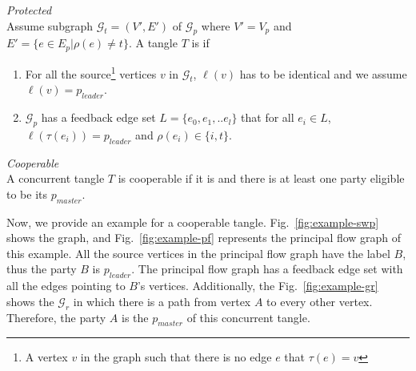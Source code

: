 \begin{definition}{\it Protected}\\
\label{def:pfok}
Assume subgraph $\mathcal{G}_{t}=(V', E')$ of $\mathcal{G}_{p}$ where $V'=V_p$ and $E'=\{e \in E_p | \rho(e) \neq t\}$.
A tangle $T$ is \keyoneOk if
\begin{enumerate}
    \item For all the source\footnote{A vertex $v$ in the graph such that there is no edge $e$ that $\tau(e) = v$} vertices $v$ in $\mathcal{G}_{t}$, $\ell(v)$ has to be identical and we assume $\ell(v)=p_{leader}$.
    \item $\mathcal{G}_{p}$ has a feedback edge set $L=\{e_0, e_1, ..e_l\}$ that for all $e_i \in L$, $\ell(\tau(e_i))= p_{leader}$ and $\rho(e_i) \in \{i, t\}$. 
\end{enumerate}

\end{definition}

 



\begin{definition}{\it Cooperable}\\
A concurrent tangle $T$ is cooperable if it is \keyoneOk and there is at least one party eligible to be its $p_{master}$.
\end{definition}



Now, we provide an example for a cooperable tangle. Fig.~\ref{fig:example-swp} shows the \genGraph graph, and Fig.~\ref{fig:example-pf} represents the principal flow graph of this example. All the source vertices in the principal flow graph have the label $B$, thus the party $B$ is $p_{leader}$. The principal flow graph has a feedback edge set with all the edges pointing to $B$'s vertices. Additionally, the Fig.~\ref{fig:example-gr} shows the $\mathcal{G}_{r}$ in which there is a path from vertex $A$ to every other vertex. Therefore, the party $A$ is the $p_{master}$ of this concurrent tangle.

